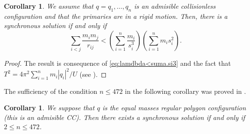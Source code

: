 \documentclass[twoside]{article}
\newtheorem{cor}[thm]{Corollary}
\theoremstyle{remark}
\begin{document}
\begin{cor}
We assume that $q=q_1,\ldots,q_n$ is an admisible collisionless configuration and that the primaries are in a rigid motion. Then, there is a synchronous solution if and only if
 \begin{equation}\label{eq:ine_prin}
 \sum_{i<j}\frac{m_im_j}{r_{ij}}<\left(\sum_{i=1}^n\frac{m_i}{s_i^3}\right)\left(\sum_{i=1}^nm_is_i^2\right).
\end{equation}
\end{cor}

\begin{proof}
The result is consequence of \eqref{eq:lamdbda<suma.si3} and the fact that $T^2=4\pi^2 \sum_{i=1}^{n}m_i|q_i|^2/U$   (see \cite[p. 109]{JaumeLlibre276}).
\end{proof}







The sufficiency of the condition $n\leq 472$ in the following corollary  was proved in \cite{li2013characterization}.

\begin{cor}\label{cor:nleq472}
We suppose that $q$ is the equal masses regular polygon configuration  (this is an admisible CC). Then there exists a synchronous solution if and only if $2\leq n\leq 472$.
\end{cor}
\end{document}
